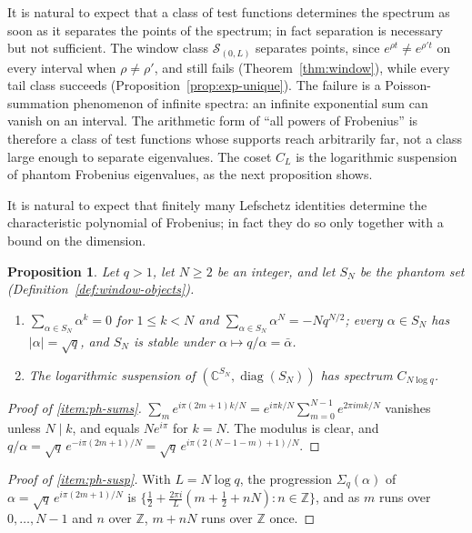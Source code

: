 \documentclass[11pt]{amsart}
\theoremstyle{plain}
\newtheorem{proposition}[theorem]{Proposition}
\theoremstyle{definition}
\theoremstyle{remark}
\numberwithin{equation}{section}
\newcommand{\C}{\mathbb{C}}
\newcommand{\Z}{\mathbb{Z}}
\DeclareMathOperator{\diag}{diag}
\begin{document}
It is natural to expect that a class of test functions determines the
spectrum as soon as it separates the points of the spectrum; in fact
separation is necessary but not sufficient. The window class
$\mathcal S_{(0,L)}$ separates points, since $e^{\rho t}\ne e^{\rho't}$
on every interval when $\rho\ne\rho'$, and still fails
(Theorem~\ref{thm:window}), while every tail class succeeds
(Proposition~\ref{prop:exp-unique}). The failure is a Poisson-summation
phenomenon of infinite spectra: an infinite exponential sum can vanish
on an interval. The arithmetic form of ``all powers of Frobenius'' is
therefore a class of test functions whose supports reach arbitrarily
far, not a class large enough to separate eigenvalues. The coset $C_L$
is the logarithmic suspension of phantom Frobenius eigenvalues, as the
next proposition shows.

It is natural to expect that finitely many Lefschetz identities
determine the characteristic polynomial of Frobenius; in fact they do
so only together with a bound on the dimension.

\begin{proposition}\label{prop:ff-phantom}
Let $q>1$, let $N\ge2$ be an integer, and let $S_N$ be the phantom set
(Definition~\ref{def:window-objects}).
\begin{enumerate}[label=(\roman*)]
\item\label{item:ph-sums} $\sum_{\alpha\in S_N}\alpha^k=0$ for
  $1\le k<N$ and $\sum_{\alpha\in S_N}\alpha^N=-Nq^{N/2}$; every
  $\alpha\in S_N$ has $|\alpha|=\sqrt q$, and $S_N$ is stable under
  $\alpha\mapsto q/\alpha=\bar\alpha$.
\item\label{item:ph-susp} The logarithmic suspension of
  $(\C^{S_N},\diag(S_N))$ has spectrum $C_{N\log q}$.
\end{enumerate}
\end{proposition}

\begin{proof}[Proof of \ref{item:ph-sums}]
$\sum_me^{i\pi(2m+1)k/N}=e^{i\pi k/N}\sum_{m=0}^{N-1}e^{2\pi imk/N}$
vanishes unless $N\mid k$, and equals $Ne^{i\pi}$ for $k=N$. The
modulus is clear, and $q/\alpha=\sqrt q\,e^{-i\pi(2m+1)/N}
=\sqrt q\,e^{i\pi(2(N-1-m)+1)/N}$.
\end{proof}

\begin{proof}[Proof of \ref{item:ph-susp}]
With $L=N\log q$, the progression $\Sigma_q(\alpha)$ of
$\alpha=\sqrt q\,e^{i\pi(2m+1)/N}$ is
$\{\tfrac12+\tfrac{2\pi i}L(m+\tfrac12+nN):n\in\Z\}$, and as $m$ runs
over $0,\dots,N-1$ and $n$ over $\Z$, $m+nN$ runs over $\Z$ once.
\end{proof}
\end{document}
